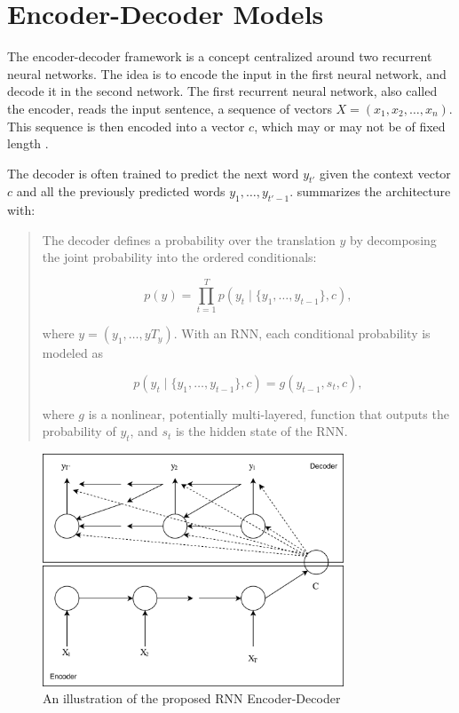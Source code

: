
\section{Encoder-Decoder Models}
\label{sec:encoder-decoder}
The encoder-decoder framework is a concept centralized around two recurrent neural networks. The idea is to encode the input in the first neural network, and decode it in the second network. The first recurrent neural network, also called the encoder, reads the input sentence, a sequence of vectors \(X = (x_{1}, x_{2}, \ldots, x_{n})\). This sequence is then encoded into a vector \(c\), which may or may not be of fixed length \citep{sutskever2014sequence, cho2014learning}. 

The decoder is often trained to predict the next word \(y_{t'}\) given the context vector \(c\) and all the previously predicted words \({y_1, \ldots, y_{t'-1}}\). \cite{bahdanau2014neural} summarizes the architecture with:

\begin{quote}
    The decoder defines a probability over the translation \(y\) by decomposing the joint probability into the ordered conditionals:
    
    \begin{equation}
        p(y)=\prod_{t=1}^{T} p(y_t \mid \{y_1, \ldots, y_{t-1}\}, c),
    \end{equation}
    
    where \(y = (y_1, \ldots, yT_y)\). With an RNN, each conditional probability is modeled as
    
    \begin{equation}
        p(y_t \mid \{y_1, \ldots, y_{t-1} \}, c) = g(y_{t-1}, s_t, c),
    \end{equation}
    
    where \(g\) is a nonlinear, potentially multi-layered, function that outputs the probability of \(y_t\), and \(s_t\) is the hidden state of the RNN.
\end{quote}

\begin{figure}[ht]
    \centering
    \includegraphics[width=0.8\textwidth]{fig/background_theory/encoder-decoder.png}
    \caption{An illustration of the proposed RNN Encoder-Decoder}
    \label{fig:purposed-encoder-decoder}
\end{figure}


